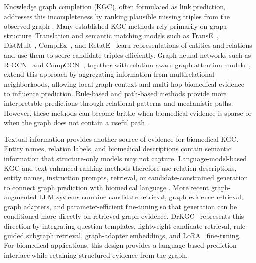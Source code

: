 \documentclass[pdflatex,sn-mathphys-num]{sn-jnl}
\newcommand{\drkgc}{DrKGC}
\begin{document}
Knowledge graph completion (KGC), often formulated as link prediction, addresses this incompleteness by ranking plausible missing triples from the observed graph \citep{nickel2015review,ji2021survey,wang2017knowledge}. Many established KGC methods rely primarily on graph structure. Translation and semantic matching models such as TransE~\citep{bordes2013translating}, DistMult~\citep{yang2014embedding}, ComplEx~\citep{trouillon2016complex}, and RotatE~\citep{sunrotate} learn representations of entities and relations and use them to score candidate triples efficiently. Graph neural networks such as R-GCN~\citep{schlichtkrull2018modeling} and CompGCN~\citep{vashishthcomposition}, together with relation-aware graph attention models~\citep{sheikh2021knowledge}, extend this approach by aggregating information from multirelational neighborhoods, allowing local graph context and multi-hop biomedical evidence to influence prediction. Rule-based and path-based methods provide more interpretable predictions through relational patterns and mechanistic paths. However, these methods can become brittle when biomedical evidence is sparse or when the graph does not contain a useful path \citep{yang2017differentiable,meilicke2019anytime,cheng2023neural}.

Textual information provides another source of evidence for biomedical KGC. Entity names, relation labels, and biomedical descriptions contain semantic information that structure-only models may not capture. Language-model-based KGC and text-enhanced ranking methods therefore use relation descriptions, entity names, instruction prompts, retrieval, or candidate-constrained generation to connect graph prediction with biomedical language \citep{devlin2019bert,gu2021domain,luo2022biogpt,wang2022simkgc,wei2026kicgptv2,zhang2024making,liu2024finetuning,wang2024kc}. More recent graph-augmented LLM systems combine candidate retrieval, graph evidence retrieval, graph adapters, and parameter-efficient fine-tuning so that generation can be conditioned more directly on retrieved graph evidence. \drkgc{}~\citep{xiao2025drkgc} represents this direction by integrating question templates, lightweight candidate retrieval, rule-guided subgraph retrieval, graph-adapter embeddings, and LoRA~\citep{hulora} fine-tuning. For biomedical applications, this design provides a language-based prediction interface while retaining structured evidence from the graph.
\end{document}
